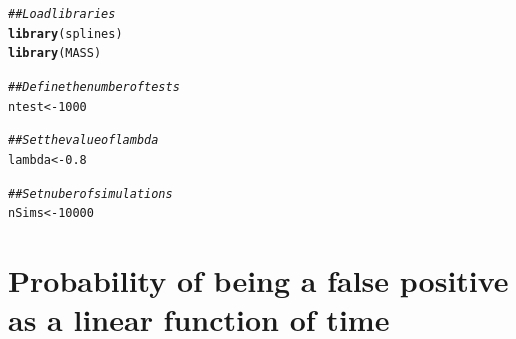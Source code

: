 \documentclass{article}\usepackage[]{graphicx}\usepackage[]{color}
\makeatletter
\newcommand{\hlnum}[1]{\textcolor[rgb]{0.686,0.059,0.569}{#1}}%
\newcommand{\hlcom}[1]{\textcolor[rgb]{0.678,0.584,0.686}{\textit{#1}}}%
\newcommand{\hlstd}[1]{\textcolor[rgb]{0.345,0.345,0.345}{#1}}%
\newcommand{\hlkwb}[1]{\textcolor[rgb]{0.69,0.353,0.396}{#1}}%
\newcommand{\hlkwd}[1]{\textcolor[rgb]{0.737,0.353,0.396}{\textbf{#1}}}%
\newenvironment{kframe}{%
 \def\at@end@of@kframe{}%
 \ifinner\ifhmode%
  \def\at@end@of@kframe{\end{minipage}}%
  \begin{minipage}{\columnwidth}%
 \fi\fi%
 \def\FrameCommand##1{\hskip\@totalleftmargin \hskip-\fboxsep
 \colorbox{shadecolor}{##1}\hskip-\fboxsep
     \hskip-\linewidth \hskip-\@totalleftmargin \hskip\columnwidth}%
 \MakeFramed {\advance\hsize-\width
   \@totalleftmargin\z@ \linewidth\hsize
   \@setminipage}}%
 {\par\unskip\endMakeFramed%
 \at@end@of@kframe}
\newenvironment{knitrout}{}{} %
\makeatother
\begin{document}
\begin{knitrout}
\color{fgcolor}\begin{kframe}
\begin{alltt}
\hlcom{## Load libraries}
\hlkwd{library}\hlstd{(splines)}
\hlkwd{library}\hlstd{(MASS)}

\hlcom{## Define the number of tests}
\hlstd{ntest} \hlkwb{<-} \hlnum{1000}

\hlcom{## Set the value of lambda}
\hlstd{lambda} \hlkwb{<-} \hlnum{0.8}

\hlcom{## Set nuber of simulations}
\hlstd{nSims} \hlkwb{<-} \hlnum{10000}
\end{alltt}
\end{kframe}
\end{knitrout}

\section{Probability of being a false positive as a linear function of time}
\end{document}
